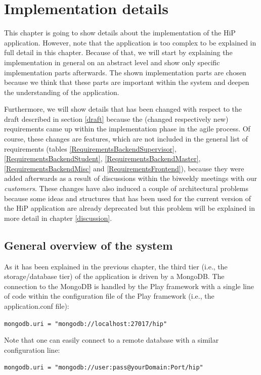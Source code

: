 \chapter[Implementation details]{Implementation details}
\label{implementation}
This chapter is going to show details about the implementation of the \ac{HiP} application. However, note that the application is too complex to be explained in full detail in this chapter. Because of that, we will start by explaining the implementation in general on an abstract level and show only specific implementation parts afterwards. The shown implementation parts are chosen because we think that these parts are important within the system and deepen the understanding of the application.

Furthermore, we will show details that has been changed with respect to the draft described in section \ref{draft} because the (changed respectively new) requirements came up within the implementation phase in the agile process. Of course, these changes are features, which are not included in the general list of requirements (tables \ref{RequirementsBackendSupervisor}, \ref{RequirementsBackendStudent}, \ref{RequirementsBackendMaster}, \ref{RequirementsBackendMisc} and \ref{RequirementsFrontend}), because they were added afterwards as a result of discussions within the biweekly meetings with our \emph{customers}. These changes have also induced a couple of architectural problems because some ideas and structures that has been used for the current version of the \ac{HiP} application are already deprecated but this problem will be explained in more detail in chapter \ref{discussion}.

\section{General overview of the system}
As it has been explained in the previous chapter, the third tier (i.e., the storage/database tier) of the application is driven by a MongoDB. The connection to the MongoDB is handled by the Play framework with a single line of code within the configuration file of the Play framework (i.e., the application.conf file):

\verb|mongodb.uri = "mongodb://localhost:27017/hip"|

Note that one can easily connect to a remote database with a similar configuration line:

\verb|mongodb.uri = "mongodb://user:pass@yourDomain:Port/hip"|  


